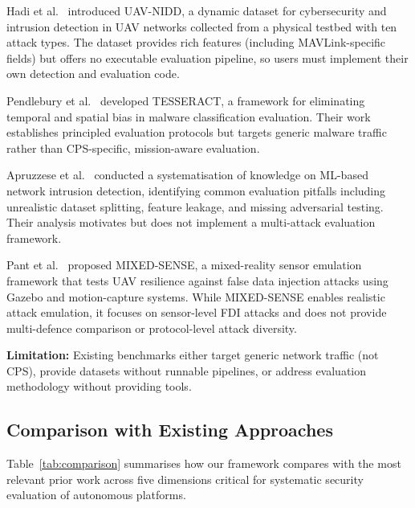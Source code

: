 Hadi et al.~\cite{hadi2025uavnidd} introduced UAV-NIDD, a dynamic dataset for cybersecurity and intrusion detection in UAV networks collected from a physical testbed with ten attack types.
The dataset provides rich features (including MAVLink-specific fields) but offers no executable evaluation pipeline, so users must implement their own detection and evaluation code.

Pendlebury et al.~\cite{pendlebury2019tesseract} developed TESSERACT, a framework for eliminating temporal and spatial bias in malware classification evaluation.
Their work establishes principled evaluation protocols but targets generic malware traffic rather than CPS-specific, mission-aware evaluation.

Apruzzese et al.~\cite{apruzzese2023sok} conducted a systematisation of knowledge on ML-based network intrusion detection, identifying common evaluation pitfalls including unrealistic dataset splitting, feature leakage, and missing adversarial testing.
Their analysis motivates but does not implement a multi-attack evaluation framework.

Pant et al.~\cite{pant2024mixedsense} proposed MIXED-SENSE, a mixed-reality sensor emulation framework that tests UAV resilience against false data injection attacks using Gazebo and motion-capture systems.
While MIXED-SENSE enables realistic attack emulation, it focuses on sensor-level FDI attacks and does not provide multi-defence comparison or protocol-level attack diversity.

\textbf{Limitation:} Existing benchmarks either target generic network traffic (not CPS), provide datasets without runnable pipelines, or address evaluation methodology without providing tools.

\subsection{Comparison with Existing Approaches}

Table~\ref{tab:comparison} summarises how our framework compares with the most relevant prior work across five dimensions critical for systematic security evaluation of autonomous platforms.

